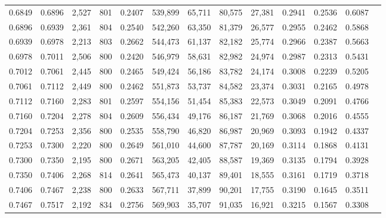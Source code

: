 \begin{tabular}{rrrrrrrrrrrrr}
0.6849 & 0.6896 &  2,527 &   801 &                                     0.2407 & 539,899 &  65,711 &  80,575 &  27,381 & 0.2941 & 0.2536 & 0.6087 \\
0.6896 & 0.6939 &  2,361 &   804 &                                     0.2540 & 542,260 &  63,350 &  81,379 &  26,577 & 0.2955 & 0.2462 & 0.5868 \\
0.6939 & 0.6978 &  2,213 &   803 &                                     0.2662 & 544,473 &  61,137 &  82,182 &  25,774 & 0.2966 & 0.2387 & 0.5663 \\
0.6978 & 0.7011 &  2,506 &   800 &                                     0.2420 & 546,979 &  58,631 &  82,982 &  24,974 & 0.2987 & 0.2313 & 0.5431 \\
0.7012 & 0.7061 &  2,445 &   800 &                                     0.2465 & 549,424 &  56,186 &  83,782 &  24,174 & 0.3008 & 0.2239 & 0.5205 \\
0.7061 & 0.7112 &  2,449 &   800 &                                     0.2462 & 551,873 &  53,737 &  84,582 &  23,374 & 0.3031 & 0.2165 & 0.4978 \\
0.7112 & 0.7160 &  2,283 &   801 &                                     0.2597 & 554,156 &  51,454 &  85,383 &  22,573 & 0.3049 & 0.2091 & 0.4766 \\
0.7160 & 0.7204 &  2,278 &   804 &                                     0.2609 & 556,434 &  49,176 &  86,187 &  21,769 & 0.3068 & 0.2016 & 0.4555 \\
0.7204 & 0.7253 &  2,356 &   800 &                                     0.2535 & 558,790 &  46,820 &  86,987 &  20,969 & 0.3093 & 0.1942 & 0.4337 \\
0.7253 & 0.7300 &  2,220 &   800 &                                     0.2649 & 561,010 &  44,600 &  87,787 &  20,169 & 0.3114 & 0.1868 & 0.4131 \\
0.7300 & 0.7350 &  2,195 &   800 &                                     0.2671 & 563,205 &  42,405 &  88,587 &  19,369 & 0.3135 & 0.1794 & 0.3928 \\
0.7350 & 0.7406 &  2,268 &   814 &                                     0.2641 & 565,473 &  40,137 &  89,401 &  18,555 & 0.3161 & 0.1719 & 0.3718 \\
0.7406 & 0.7467 &  2,238 &   800 &                                     0.2633 & 567,711 &  37,899 &  90,201 &  17,755 & 0.3190 & 0.1645 & 0.3511 \\
0.7467 & 0.7517 &  2,192 &   834 &                                     0.2756 & 569,903 &  35,707 &  91,035 &  16,921 & 0.3215 & 0.1567 & 0.3308 \\

\end{tabular}
